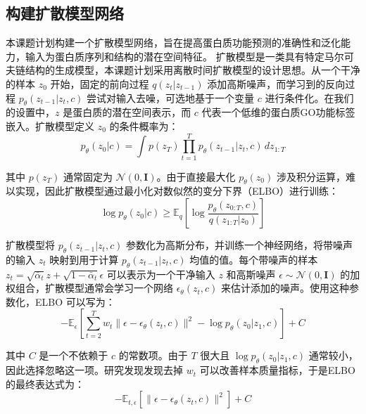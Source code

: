 \subsection{构建扩散模型网络}
本课题计划构建一个扩散模型网络，旨在提高蛋白质功能预测的准确性和泛化能力，输入为蛋白质序列和结构的潜在空间特征。
扩散模型是一类具有特定马尔可夫链结构的生成模型，本课题计划采用离散时间扩散模型的设计思想\cite{hoogeboom2021argmax}。从一个干净的样本 \( z_0 \) 开始，固定的前向过程 \( q(z_t | z_{t-1}) \) 添加高斯噪声，而学习到的反向过程 \( p_\theta(z_{t-1} | z_t, c) \) 尝试对输入去噪，可选地基于一个变量 \( c \) 进行条件化。在我们的设置中，\( z \) 是蛋白质的潜在空间表示，而 \( c \) 代表一个低维的蛋白质GO功能标签嵌入。扩散模型定义 \( z_0 \) 的条件概率为\cite{kingma2021variational}：
\begin{equation}
p_\theta(z_0 | c) = \int p(z_T) \prod_{t=1}^{T} p_\theta(z_{t-1} | z_t, c) \, dz_{1:T}
\end{equation}

其中 \( p(z_T) \) 通常固定为 \( \mathcal{N}(0, \mathbf{I}) \)。由于直接最大化 \( p_\theta(z_0) \) 涉及积分运算，难以实现，因此扩散模型通过最小化对数似然的变分下界（ELBO\cite{song2020score}）进行训练：
\begin{equation}
\log p_\theta(z_0 | c) \geq \mathbb{E}_q \left[\log \frac{p_\theta(z_{0:T}, c)}{q(z_{1:T} | z_0)}\right]
\end{equation}

扩散模型将 \( p_\theta(z_{t-1} | z_t, c) \) 参数化为高斯分布，并训练一个神经网络，将带噪声的输入 \( z_t \) 映射到用于计算 \( p_\theta(z_{t-1} | z_t, c) \) 均值的值。每个带噪声的样本 \( z_t = \sqrt{\bar{\alpha}_t} z + \sqrt{1 - \bar{\alpha}_t} \epsilon \) 可以表示为一个干净输入 \( z \) 和高斯噪声 \( \epsilon \sim \mathcal{N}(0, \mathbf{I}) \) 的加权组合，扩散模型通常会学习一个网络 \( \epsilon_\theta(z_t, c) \) 来估计添加的噪声\cite{sohl2015deep}。使用这种参数化，ELBO 可以写为：
\begin{equation}
-\mathbb{E}_\epsilon \left[\sum_{t=2}^{T} w_t \|\epsilon - \epsilon_\theta(z_t, c)\|^2 - \log p_\theta(z_0 | z_1, c)\right] + C
\end{equation}

其中 \( C \) 是一个不依赖于 \( c \) 的常数项。由于 \( T\) 很大且 \( \log p_\theta(z_0 | z_1, c) \) 通常较小，因此选择忽略这一项。研究发现发现去掉 \( w_t \) 可以改善样本质量指标\cite{ho2020denoising}，于是ELBO的最终表达式为：
\begin{equation}
-\mathbb{E}_{t, \epsilon} \left[\|\epsilon - \epsilon_\theta(z_t, c)\|^2\right] + C
\end{equation}

